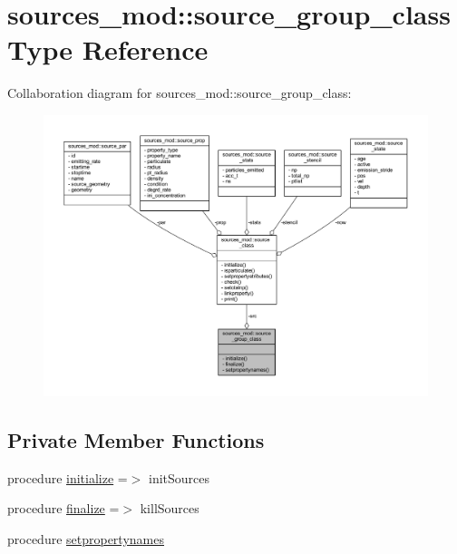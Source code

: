 \hypertarget{structsources__mod_1_1source__group__class}{}\section{sources\+\_\+mod\+:\+:source\+\_\+group\+\_\+class Type Reference}
\label{structsources__mod_1_1source__group__class}


Collaboration diagram for sources\+\_\+mod\+:\+:source\+\_\+group\+\_\+class\+:\nopagebreak
\begin{figure}[H]
\begin{center}
\leavevmode
\includegraphics[width=350pt]{structsources__mod_1_1source__group__class__coll__graph}
\end{center}
\end{figure}
\subsection*{Private Member Functions}
\begin{DoxyCompactItemize}
\item 
procedure \mbox{\hyperlink{structsources__mod_1_1source__group__class_a186abc677118adbf1f9cff405dac330e}{initialize}} =$>$ init\+Sources
\item 
procedure \mbox{\hyperlink{structsources__mod_1_1source__group__class_ab1f12af6502f7e468e07d82555ea5cb9}{finalize}} =$>$ kill\+Sources
\item 
procedure \mbox{\hyperlink{structsources__mod_1_1source__group__class_afcd9f3654f50966bc72ffc32b4bee7dd}{setpropertynames}}
\end{DoxyCompactItemize}
